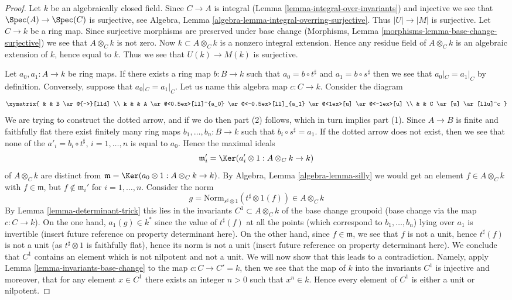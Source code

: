 \begin{proof}
Let $k$ be an algebraically closed field.
Since $C \to A$ is integral (Lemma \ref{lemma-integral-over-invariants})
and injective we see that
$\Spec(A) \to \Spec(C)$ is surjective, see
Algebra, Lemma \ref{algebra-lemma-integral-overring-surjective}.
Thus $|U| \to |M|$ is surjective.
Let $C \to k$ be a ring map. Since surjective morphisms are
preserved under base change
(Morphisms, Lemma \ref{morphisms-lemma-base-change-surjective}) we see that
$A \otimes_C k$ is not zero. Now $k \subset A \otimes_C k$ is a
nonzero integral extension. Hence any residue field of $A \otimes_C k$
is an algebraic extension of $k$, hence equal to $k$. Thus we see that
$U(k) \to M(k)$ is surjective.

\medskip\noindent
Let $a_0, a_1 : A \to k$ be ring maps. If there exists a ring map
$b : B \to k$ such that $a_0 = b \circ t^\sharp$ and $a_1 = b \circ s^\sharp$
then we see that $a_0|_C = a_1|_C$ by definition.
Conversely, suppose that $a_0|_C = a_1|_C$. Let us name this algebra
map $c : C \to k$. Consider the diagram
$$
\xymatrix{
& &
B \ar@{-->}[lld] \\
k & &
A
\ar@<0.5ex>[ll]^{a_0}
\ar@<-0.5ex>[ll]_{a_1}
\ar@<1ex>[u]
\ar@<-1ex>[u] \\
& &
C \ar[u] \ar[llu]^c
}
$$
We are trying to construct the dotted arrow, and if we do then
part (2) follows, which in turn implies part (1).
Since $A \to B$ is finite and faithfully flat
there exist finitely many ring maps
$b_1, \ldots, b_n : B \to k$ such that $b_i \circ s^\sharp = a_1$.
If the dotted arrow does not exist, then we see that none of the
$a'_i = b_i \circ t^\sharp$, $i = 1, \ldots, n$ is equal to $a_0$.
Hence the maximal ideals
$$
\mathfrak m'_i = \Ker(a_i' \otimes 1 : A \otimes_C k \to k)
$$
of $A \otimes_C k$ are distinct from
$\mathfrak m = \Ker(a_0 \otimes 1 : A \otimes_C k \to k)$.
By Algebra, Lemma \ref{algebra-lemma-silly} we would get an element
$f \in A \otimes_C k$ with $f \in \mathfrak m$, but
$f \not \in \mathfrak m_i'$ for $i = 1, \ldots, n$.
Consider the norm
$$
g = \text{Norm}_{s^\sharp \otimes 1}(t^\sharp \otimes 1(f))
\in
A \otimes_C k
$$
By Lemma \ref{lemma-determinant-trick} this lies in the invariants
$C^1 \subset A \otimes_C k$ of the base change
groupoid (base change via the map $c : C \to k$). On the one hand,
$a_1(g) \in k^*$ since
the value of $t^\sharp(f)$ at all the points (which correspond to
$b_1, \ldots, b_n$) lying over $a_1$ is
invertible (insert future reference on property determinant here).
On the other hand, since $f \in \mathfrak m$, we see that
$f$ is not a unit, hence $t^\sharp(f)$ is not a unit
(as $t^\sharp \otimes 1$ is faithfully flat),
hence its norm is not a unit (insert future reference
on property determinant here). We conclude that $C^1$ contains
an element which is not nilpotent
and not a unit. We will now show that this leads to a contradiction.
Namely, apply Lemma \ref{lemma-invariants-base-change}
to the map $c : C \to C' = k$, then
we see that the map of $k$ into the invariants $C^1$ is injective
and moreover, that for any element $x \in C^1$ there exists an integer
$n > 0$ such that $x^n \in k$. Hence every element of $C^1$ is
either a unit or nilpotent.
\end{proof}

